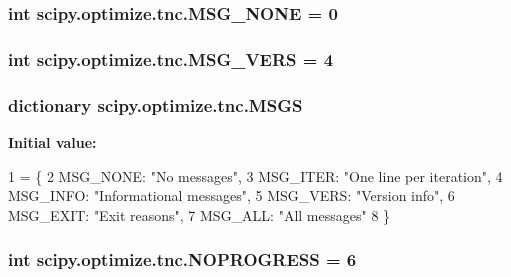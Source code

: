 \subsubsection[{M\+S\+G\+\_\+\+N\+O\+N\+E}]{\setlength{\rightskip}{0pt plus 5cm}int scipy.\+optimize.\+tnc.\+M\+S\+G\+\_\+\+N\+O\+N\+E = 0}\label{namespacescipy_1_1optimize_1_1tnc_ab2e75c0c1f1fdb2509c68ad3b4a81ab9}
\hypertarget{namespacescipy_1_1optimize_1_1tnc_aa7f5bc1e2cf027aa4490dd2ad8412860}{}
\subsubsection[{M\+S\+G\+\_\+\+V\+E\+R\+S}]{\setlength{\rightskip}{0pt plus 5cm}int scipy.\+optimize.\+tnc.\+M\+S\+G\+\_\+\+V\+E\+R\+S = 4}\label{namespacescipy_1_1optimize_1_1tnc_aa7f5bc1e2cf027aa4490dd2ad8412860}
\hypertarget{namespacescipy_1_1optimize_1_1tnc_a6e98b71175e3f3381bd5a1d3b2592472}{}
\subsubsection[{M\+S\+G\+S}]{\setlength{\rightskip}{0pt plus 5cm}dictionary scipy.\+optimize.\+tnc.\+M\+S\+G\+S}\label{namespacescipy_1_1optimize_1_1tnc_a6e98b71175e3f3381bd5a1d3b2592472}
{\bfseries Initial value\+:}
\begin{DoxyCode}
1 = \{
2         MSG\_NONE: \textcolor{stringliteral}{"No messages"},
3         MSG\_ITER: \textcolor{stringliteral}{"One line per iteration"},
4         MSG\_INFO: \textcolor{stringliteral}{"Informational messages"},
5         MSG\_VERS: \textcolor{stringliteral}{"Version info"},
6         MSG\_EXIT: \textcolor{stringliteral}{"Exit reasons"},
7         MSG\_ALL: \textcolor{stringliteral}{"All messages"}
8 \}
\end{DoxyCode}
\hypertarget{namespacescipy_1_1optimize_1_1tnc_af3c6c4ea7652e3ccfeff79bc2b6b00ac}{}
\subsubsection[{N\+O\+P\+R\+O\+G\+R\+E\+S\+S}]{\setlength{\rightskip}{0pt plus 5cm}int scipy.\+optimize.\+tnc.\+N\+O\+P\+R\+O\+G\+R\+E\+S\+S = 6}\label{namespacescipy_1_1optimize_1_1tnc_af3c6c4ea7652e3ccfeff79bc2b6b00ac}
\hypertarget{namespacescipy_1_1optimize_1_1tnc_aab91a376900ced001d3a219d07630129}{}
